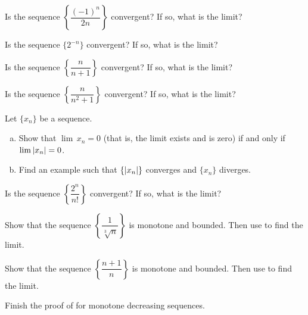 \begin{exercise}
Is the sequence
$\left\{ \dfrac{{(-1)}^n}{2n} \right\}$
convergent?  If so, what is the limit?
\end{exercise}

\begin{exercise}
Is the sequence
$\{ 2^{-n} \}$
convergent?  If so, what is the limit?
\end{exercise}

\begin{exercise}
Is the sequence
$\left\{ \dfrac{n}{n+1} \right\}$
convergent?  If so, what is the limit?
\end{exercise}

\begin{exercise}
Is the sequence
$\left\{ \dfrac{n}{n^2+1} \right\}$
convergent?  If so, what is the limit?
\end{exercise}

\begin{exercise} \label{exercise:absconv}
Let $\{ x_n \}$ be a sequence.
\begin{enumerate}[a)]
\item Show that $\lim\, x_n = 0$ (that is, the limit exists and is zero)
if and only if $\lim \left\lvert {x_n} \right\rvert = 0$.
\item Find an example such that $\{ \left\lvert {x_n} \right\rvert \}$ converges and $\{ x_n \}$
diverges.
\end{enumerate}
\end{exercise}

\begin{exercise}
Is the sequence
$\left\{ \dfrac{2^n}{n!} \right\}$
convergent?  If so, what is the limit?
\end{exercise}

\begin{exercise}
Show that the sequence
$\left\{ \dfrac{1}{\sqrt[3]{n}} \right\}$ is monotone and bounded.  Then use
 to find the limit.
\end{exercise}

\begin{exercise}
Show that the sequence
$\left\{ \dfrac{n+1}{n} \right\}$
is monotone and bounded.  Then use
 to find the limit.
\end{exercise}

\begin{exercise}
Finish the proof of  for monotone decreasing
sequences.
\end{exercise}

